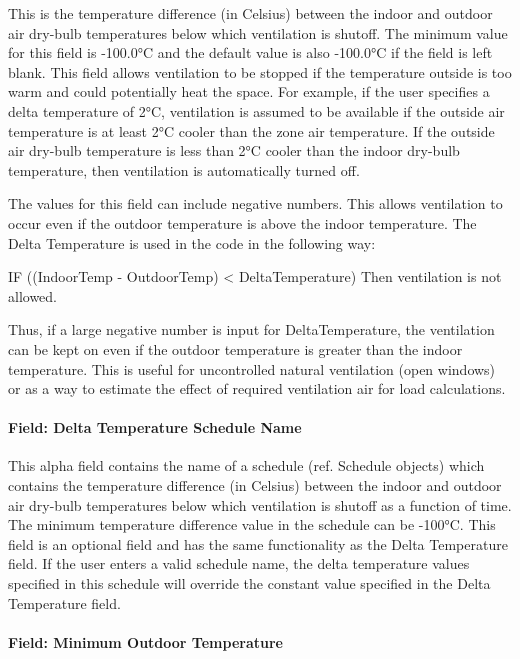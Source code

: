 This is the temperature difference (in Celsius) between the indoor and outdoor air dry-bulb temperatures below which ventilation is shutoff. The minimum value for this field is -100.0°C and the default value is also -100.0°C if the field is left blank. This field allows ventilation to be stopped if the temperature outside is too warm and could potentially heat the space. For example, if the user specifies a delta temperature of 2°C, ventilation is assumed to be available if the outside air temperature is at least 2°C cooler than the zone air temperature. If the outside air dry-bulb temperature is less than 2°C cooler than the indoor dry-bulb temperature, then ventilation is automatically turned off.

The values for this field can include negative numbers. This allows ventilation to occur even if the outdoor temperature is above the indoor temperature. The Delta Temperature is used in the code in the following way:

IF ((IndoorTemp - OutdoorTemp) \textless{} DeltaTemperature) Then ventilation is not allowed.

Thus, if a large negative number is input for DeltaTemperature, the ventilation can be kept on even if the outdoor temperature is greater than the indoor temperature. This is useful for uncontrolled natural ventilation (open windows) or as a way to estimate the effect of required ventilation air for load calculations.

\paragraph{Field: Delta Temperature Schedule Name}\label{field-delta-temperature-schedule-name-1}

This alpha field contains the name of a schedule (ref. Schedule objects) which contains the temperature difference (in Celsius) between the indoor and outdoor air dry-bulb temperatures below which ventilation is shutoff as a function of time. The minimum temperature difference value in the schedule can be -100°C. This field is an optional field and has the same functionality as the Delta Temperature field. If the user enters a valid schedule name, the delta temperature values specified in this schedule will override the constant value specified in the Delta Temperature field.

\paragraph{Field: Minimum Outdoor Temperature}\label{field-minimum-outdoor-temperature-1}

